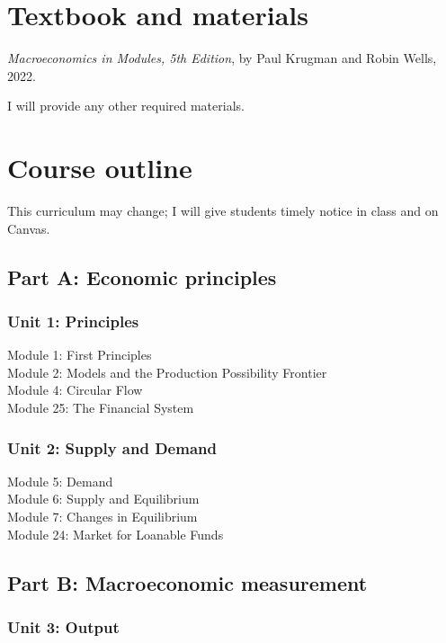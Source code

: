 \documentclass[
    letterpaper,paper=portrait,fleqn,
    DIV=16,fontsize=11pt,twoside=semi,
    parskip=full-,
    headings=standardclasses]
{scrartcl}
\begin{document}
\section*{Textbook and materials}

\emph{Macroeconomics in Modules, 5th Edition}, by Paul Krugman and Robin Wells, 2022.

I will provide any other required materials.

\section*{Course outline}

This curriculum may change; I will give students timely notice in class and on Canvas.

\subsection*{Part A: Economic principles}

\subsubsection*{Unit 1: Principles}

Module 1: First Principles \\
Module 2: Models and the Production Possibility Frontier \\
Module 4: Circular Flow \\
Module 25: The Financial System

\subsubsection*{Unit 2: Supply and Demand}

Module 5: Demand \\
Module 6: Supply and Equilibrium \\
Module 7: Changes in Equilibrium \\
Module 24: Market for Loanable Funds

\subsection*{Part B: Macroeconomic measurement}

\subsubsection*{Unit 3: Output}
\end{document}
